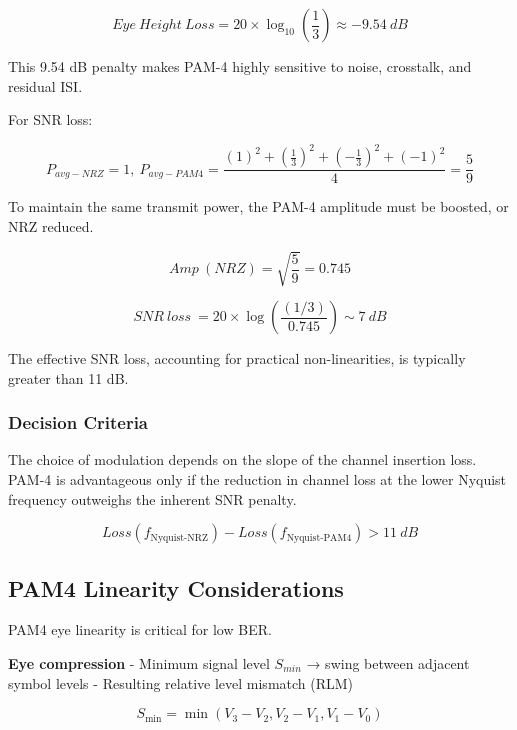 \begin{equation}
    Eye\ Height\ Loss = 20 \times \log_{10}{\left(\frac{1}{3}\right)} \approx -9.54\ dB
\end{equation}

This 9.54 dB penalty makes PAM-4 highly sensitive to noise, crosstalk, and residual ISI.

For SNR loss:

\begin{equation}
    P_{avg - NRZ} = 1 ,\ P_{avg - PAM4} = \frac{(1)^2 + \left( \frac{1}{3} \right)^2 + \left( - \frac{1}{3} \right)^2 + ( - 1)^2}{4} = \frac{5}{9}
\end{equation}

To maintain the same transmit power, the PAM-4 amplitude must be boosted, or NRZ reduced.

\begin{equation}
    Amp\ (NRZ) = \sqrt{\frac{5}{9}} = 0.745
\end{equation}

\begin{equation}
    SNR\ loss\ = 20 \times \log\left(\frac{(1/3)}{0.745}\right) \sim 7\ dB
\end{equation}

The effective SNR loss, accounting for practical non-linearities, is typically greater than 11 dB.

\subsubsection{Decision Criteria}
The choice of modulation depends on the slope of the channel insertion loss. PAM-4 is advantageous only if the reduction in channel loss at the lower Nyquist frequency outweighs the inherent SNR penalty.

\begin{equation}
    Loss\!\left(f_{\text{Nyquist-NRZ}}\right) - Loss\!\left(f_{\text{Nyquist-PAM4}}\right) > 11\ dB
\end{equation}

\subsection{PAM4 Linearity Considerations}
PAM4 eye linearity is critical for low BER.

\textbf{Eye compression}
- Minimum signal level $S_{min}$ → swing between adjacent symbol levels
- Resulting relative level mismatch (RLM)

\begin{equation}
    S_{\min} = \min{(V_3 - V_2 , V_2 - V_1 , V_1 - V_0)}
\end{equation}


